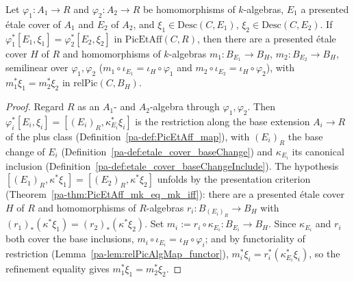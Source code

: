 \begin{theorem}
  \label{pa-thm:PicEtAff_exists_relPicAlgMap_eq}
  \leanok

  Let \(\varphi_1 \colon A_1 \to R\) and \(\varphi_2 \colon A_2 \to R\) be homomorphisms of
  \(k\)-algebras, \(E_1\) a presented \'etale cover of \(A_1\) and \(E_2\) of \(A_2\), and
  \(\xi_1 \in \mathrm{Desc}(C, E_1)\), \(\xi_2 \in \mathrm{Desc}(C, E_2)\). If \(\varphi_1^{*}
  [E_1, \xi_1] = \varphi_2^{*}[E_2, \xi_2]\) in \(\mathrm{PicEtAff}(C, R)\), then there are a
  presented \'etale cover \(H\) of \(R\) and homomorphisms of \(k\)-algebras \(m_1 \colon B_{E_1}
  \to B_H\), \(m_2 \colon B_{E_2} \to B_H\), semilinear over \(\varphi_1, \varphi_2\)
  (\(m_1 \circ \iota_{E_1} = \iota_H \circ \varphi_1\) and \(m_2 \circ \iota_{E_2} = \iota_H \circ
  \varphi_2\)), with \(m_1^{*}\xi_1 = m_2^{*}\xi_2\) in \(\mathrm{relPic}(C, B_H)\).
\end{theorem}
\begin{proof}
  \leanok
  Regard \(R\) as an \(A_1\)- and \(A_2\)-algebra through \(\varphi_1, \varphi_2\). Then
  \(\varphi_i^{*}[E_i, \xi_i] = [(E_i)_R, \kappa_{E_i}^{*}\xi_i]\) is the restriction along the base
  extension \(A_i \to R\) of the plus class (Definition~\ref{pa-def:PicEtAff_map}), with \((E_i)_R\)
  the base change of \(E_i\) (Definition~\ref{pa-def:etale_cover_baseChange}) and \(\kappa_{E_i}\) its
  canonical inclusion (Definition~\ref{pa-def:etale_cover_baseChangeInclude}). The hypothesis
  \([(E_1)_R, \kappa^{*}\xi_1] = [(E_2)_R, \kappa^{*}\xi_2]\) unfolds by the presentation criterion
  (Theorem~\ref{pa-thm:PicEtAff_mk_eq_mk_iff}): there are a presented \'etale cover \(H\) of \(R\) and
  homomorphisms of \(R\)-algebras \(r_i \colon B_{(E_i)_R} \to B_H\) with
  \((r_1)_{*}(\kappa^{*}\xi_1) = (r_2)_{*}(\kappa^{*}\xi_2)\). Set \(m_i := r_i \circ \kappa_{E_i}
  \colon B_{E_i} \to B_H\). Since \(\kappa_{E_i}\) and \(r_i\) both cover the base inclusions,
  \(m_i \circ \iota_{E_i} = \iota_H \circ \varphi_i\); and by functoriality of restriction
  (Lemma~\ref{pa-lem:relPicAlgMap_functor}), \(m_i^{*}\xi_i = r_i^{*}(\kappa_{E_i}^{*}\xi_i)\), so the
  refinement equality gives \(m_1^{*}\xi_1 = m_2^{*}\xi_2\).
\end{proof}

